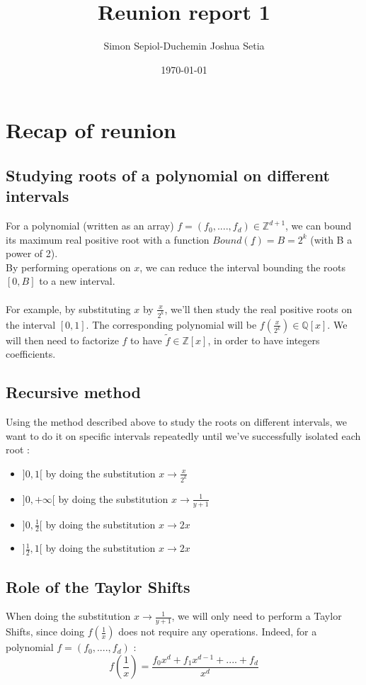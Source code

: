 \documentclass[a4paper,12pt]{article}
\title{Reunion report 1}
\author{Simon Sepiol-Duchemin Joshua Setia}
\date{\today}
\begin{document}
\maketitle

\section{Recap of reunion}

\subsection*{Studying roots of a polynomial on different intervals}

For a polynomial (written as an array) \( f = (f_0,....,f_d) \in \mathbb{Z}^{d+1} \), we can bound its maximum real positive root with a function \( Bound(\underline{f}) = B = 2^k\) (with B a power of 2).\\
By performing operations on \(x\), we can reduce the interval bounding the roots \([0,B]\) to a new interval.\\
\\
For example, by substituting \(x\) by \(\frac{x}{2^k}\), we'll then study the real positive roots on the interval \([0,1]\).
The corresponding polynomial will be \(f(\frac{x}{2^k}) \in \mathbb{Q}[x]\). We will then need to factorize \(f\) to have \(\tilde{f} \in \mathbb{Z}[x]\), in order to have integers coefficients.

\subsection*{Recursive method}
Using the method described above to study the roots on different intervals, we want to do it on specific intervals repeatedly until we've successfully isolated each root :
\begin{itemize}
  \item \(]0,1[\) by doing the substitution \(x \rightarrow \frac{x}{2^k}\)
  \item \(]0,+\infty[\) by doing the substitution \(x \rightarrow \frac{1}{y+1}\)
  \item \(]0,\frac{1}{2}[\) by doing the substitution \(x \rightarrow 2x\)
  \item \(]\frac{1}{2},1[\) by doing the substitution \(x \rightarrow 2x\)
\end{itemize}

\subsection*{Role of the Taylor Shifts}
When doing the substitution \(x \rightarrow \frac{1}{y+1}\), we will only need to perform a Taylor Shifts, since doing \(f(\frac{1}{x})\) does not require any operations. Indeed, for a polynomial \(f = (f_0,....,f_d)\) :
\[
  f(\frac{1}{x}) = \frac{f_0x^d + f_1x^{d-1} + .... + f_d}{x^d}
\]
\end{document}
